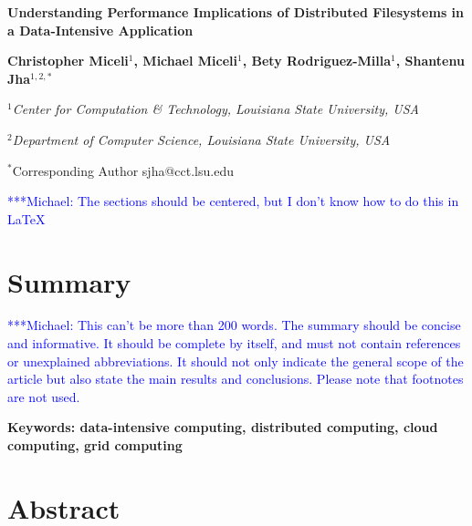 \documentclass[a4paper,11pt]{article} \pagestyle{empty} \usepackage{amssymb}
\newcommand{\micnote}[1]{ {\textcolor{blue} { ***Michael: #1 }}} \else
\begin{document}
\begin{center}

\textbf{\large Understanding Performance Implications of Distributed
Filesystems in a Data-Intensive Application}

\vspace{0.05in}

\textbf{Christopher Miceli$^{1}$, Michael Miceli$^{1}$, Bety
Rodriguez-Milla$^{1}$, Shantenu Jha$^{1,2,*}$}

\small{\emph{$^{1}$Center for Computation \& Technology, Louisiana State
University, USA}}

\small{\emph{$^{2}$Department of Computer Science, Louisiana State University,
USA}}

{\footnotesize {\hspace{0.0 in} $^*$Corresponding Author sjha@cct.lsu.edu}}

\end{center}

\micnote{The sections should be centered, but I don't know how to do this in
\LaTeX} \section{Summary}

\micnote{This can't be more than 200 words. The summary should be concise and
informative. It should be complete by itself, and must not contain references
or unexplained abbreviations. It should not only indicate the general scope of
the article but also state the main results and conclusions. Please note that
footnotes are not used.}

\begin{center}\textbf{\small{Keywords:  data-intensive computing, distributed
computing, cloud computing, grid computing}}\end{center}

\section{Abstract}
\end{document}
